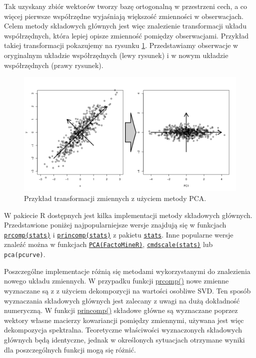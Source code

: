 \documentclass[polish,]{book}
\begin{document}
Tak uzyskany zbiór wektorów tworzy bazę ortogonalną w przestrzeni cech, a co
więcej pierwsze współrzędne wyjaśniają większość zmienności w obserwacjach. Celem metody składowych głównych jest więc znalezienie transformacji układu współrzędnych, która lepiej opisze zmienność pomiędzy obserwacjami. Przykład takiej
transformacji pokazujemy na rysunku \ref{fig:PCA}. Przedstawiamy obserwacje w oryginalnym układzie współrzędnych (lewy rysunek) i w nowym układzie współrzędnych
(prawy rysunek).

\begin{figure}

{\centering \includegraphics[width=1\linewidth]{PCAprzykald} 

}

\caption{Przykład transformacji zmiennych z użyciem metody PCA.}\label{fig:PCA}
\end{figure}

W pakiecie R dostępnych jest kilka implementacji metody składowych głównych.
Przedstawione poniżej najpopularniejsze wersje znajdują się w funkcjach \href{https://rdrr.io/r/stats/prcomp.html}{\texttt{prcomp(stats)}}
i \href{https://rdrr.io/r/stats/princomp.html}{\texttt{princomp(stats)}} z pakietu \href{https://rdrr.io/r/\#stats}{\texttt{stats}}. Inne popularne wersje znaleźć można w funkcjach \href{https://rdrr.io/cran/FactoMineR/man/PCA.html}{\texttt{PCA(FactoMineR)}}, \href{https://rdrr.io/r/stats/cmdscale.html}{\texttt{cmdscale(stats)}} lub \texttt{pca(pcurve)}.

Poszczególne implementacje różnią się metodami wykorzystanymi do znalezienia
nowego układu zmiennych. W przypadku funkcji \href{https://rdrr.io/r/stats/princomp.html}{prcomp()} nowe zmienne wyznaczane są z z użyciem dekompozycji na wartości osobliwe SVD. Ten sposób wyznaczania
składowych głównych jest zalecany z uwagi na dużą dokładność numeryczną. W
funkcji \href{https://rdrr.io/r/stats/princomp.html}{princomp()} składowe główne są wyznaczane poprzez wektory własne macierzy kowariancji pomiędzy zmiennymi, używana jest więc dekompozycja spektralna.
Teoretyczne właściwości wyznaczonych składowych głównych będą identyczne, jednak w określonych sytuacjach otrzymane wyniki dla poszczególnych funkcji mogą
się różnić.
\end{document}

